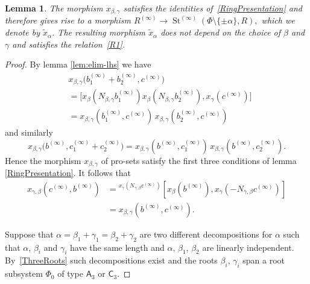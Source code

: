 \documentclass{article}
\numberwithin{equation}{section}
\newtheorem{lemma}{Lemma} \numberwithin{lemma}{section}
\theoremstyle{definition}
\theoremstyle{remark}
\DeclareMathOperator\St{St}
\newcommand{\up}[2]{{^{#1}\!{#2}}}
\newcommand{\rA}{\mathsf{A}}
\newcommand{\rC}{\mathsf{C}}
\begin{document}
\begin{lemma}\label{lem:new-root}
 The morphism $x_{\beta, \gamma}$ satisfies the identities of~\cref{RingPresentation} and therefore gives rise to a morphism
 $R^{(\infty)} \to \St^{(\infty)}(\Phi\setminus\{\pm\alpha\}, R),$ which we denote by $\widetilde{x}_\alpha$. The resulting morphism $\widetilde{x}_\alpha$ does not depend on the choice of $\beta$ and $\gamma$ and satisfies the relation~\eqref{R1}.
\end{lemma}
\begin{proof}
 By lemma \ref{lem:elim-lhs} we have
 \begin{align*}
 &x_{\beta, \gamma}\bigl(b_1^{(\infty)} + b_2^{(\infty)}, c^{(\infty)}\bigr)\\
 &= \bigl[x_\beta(N_{\beta, \gamma} b_1^{(\infty)})
 x_\beta(N_{\beta, \gamma} b_2^{(\infty)}),
 x_\gamma(c^{(\infty)})\bigr]\\
 &= x_{\beta, \gamma}(b_1^{(\infty)}, c^{(\infty)})\,
 x_{\beta, \gamma}(b_2^{(\infty)}, c^{(\infty)})
 \end{align*}
 and similarly
 \[x_{\beta, \gamma}\bigl(b^{(\infty)}, c_1^{(\infty)} + c_2^{(\infty)}\bigr)
 = x_{\beta, \gamma}(b^{(\infty)}, c_1^{(\infty)})\,
 x_{\beta, \gamma}(b^{(\infty)}, c_2^{(\infty)}).\]
 Hence the morphism \(x_{\beta, \gamma}\) of pro-sets satisfy the first three conditions of lemma \ref{RingPresentation}. It follows that
 \begin{align*}
 x_{\gamma, \beta}(c^{(\infty)}, b^{(\infty)})
 &= \up{x_\gamma(N_{\gamma, \beta} c^{(\infty)})}
 {[x_\beta(b^{(\infty)}), x_\gamma(-N_{\gamma, \beta} c^{(\infty)})]}\\
 &= x_{\beta, \gamma}(b^{(\infty)}, c^{(\infty)}).
 \end{align*}

 Suppose that \(\alpha = \beta_1 + \gamma_1 = \beta_2 + \gamma_2\) are two different decompositions for $\alpha$ such that $\alpha$, $\beta_i$ and $\gamma_i$ have the same length and \(\alpha\), \(\beta_1\), \(\beta_2\) are linearly independent.
 By~\cref{ThreeRoots} such decompositions exist and the roots $\beta_i$, $\gamma_i$ span a root subsystem $\Phi_0$ of type \(\rA_3\) or \(\rC_3\).


\end{proof}
\end{document}

